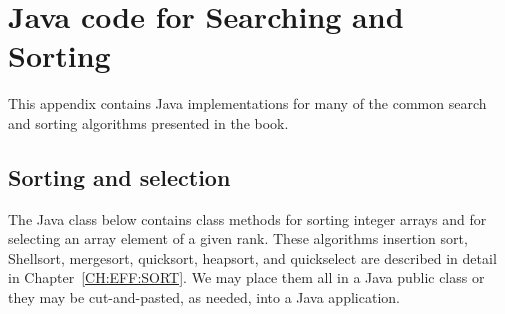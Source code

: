 \chapter{Java code for Searching and Sorting}
\label{ch:app:sortsearchcode}

This appendix contains Java implementations for many of the
common search and sorting algorithms presented in 
the book.

\section{Sorting and selection}
\label{sec:app:order}

The Java class below contains class methods for sorting 
integer arrays and for selecting an array element of a given rank. 
These algorithms insertion sort, Shellsort, mergesort, quicksort, heapsort, 
and quickselect are described in detail in Chapter~\ref{CH:EFF:SORT}.  We
may place them all in a Java public class or they
may be cut-and-pasted, as needed, into a Java application.


